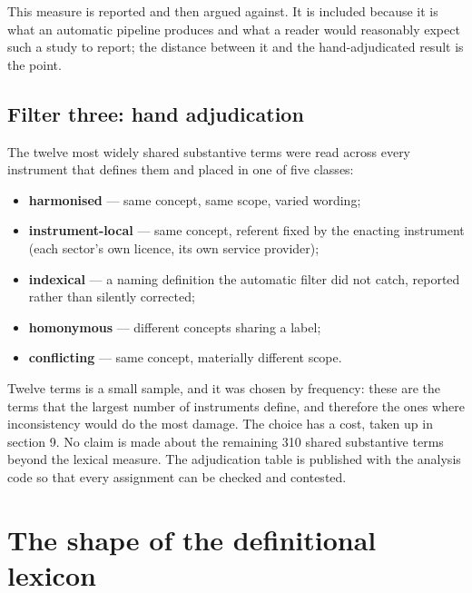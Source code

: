 \documentclass[11pt]{article}
\begin{document}
This measure is reported and then argued against. It is included because it
is what an automatic pipeline produces and what a reader would reasonably
expect such a study to report; the distance between it and the
hand-adjudicated result is the point.

\subsection{Filter three: hand adjudication}

The twelve most widely shared substantive terms were read across every
instrument that defines them and placed in one of five classes:

\begin{itemize}
\item \textbf{harmonised} --- same concept, same scope, varied wording;
\item \textbf{instrument-local} --- same concept, referent fixed by the
enacting instrument (each sector's own licence, its own service provider);
\item \textbf{indexical} --- a naming definition the automatic filter did not
catch, reported rather than silently corrected;
\item \textbf{homonymous} --- different concepts sharing a label;
\item \textbf{conflicting} --- same concept, materially different scope.
\end{itemize}

Twelve terms is a small sample, and it was chosen by frequency: these are the
terms that the largest number of instruments define, and therefore the ones
where inconsistency would do the most damage. The choice has a cost, taken up
in section 9. No claim is made about the remaining 310 shared substantive
terms beyond the lexical measure. The adjudication table is published with
the analysis code so that every assignment can be checked and contested.

\section{The shape of the definitional lexicon}
\end{document}
